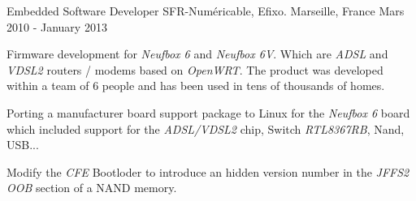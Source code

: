\begin{cventries}
  \cventry
    {Embedded Software Developer} %
    {SFR-Numéricable, Efixo.} %
    {Marseille, France} %
    {Mars 2010 - January 2013} %
    {
      \begin{cvitems} %
        \item {Firmware development for \textit{Neufbox 6} and \textit{Neufbox 6V}.\newline
          Which are \textit{ADSL} and \textit{VDSL2} routers / modems based on \textit{OpenWRT}.\newline
          The product was developed within a team of 6 people and has been used in tens of thousands of homes.}
        \item {Porting a manufacturer board support package to Linux for the \textit{Neufbox 6} board which included support for the \textit{ADSL/VDSL2} chip, Switch \textit{RTL8367RB}, Nand, USB...}
        \item {Modify the \textit{CFE} Bootloder to introduce an hidden version number in the \textit{JFFS2} \textit{OOB} section of a NAND memory.}
      \end{cvitems}
    }

\end{cventries}
